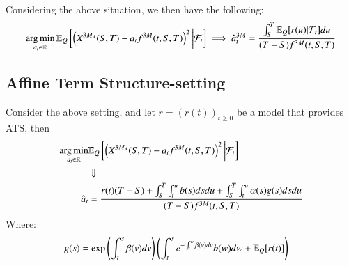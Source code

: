 \begin{result}
\label{result: optimal_SOFR_hedge_3MA_vs_3GM}
Considering the above situation, we then have the following:
\begin{align*}
\operatorname*{arg\,min}\limits_{a_{t} \in \mathbb{R}}\mathbb{E}_{Q}\left[
\left(
X^{3M_{A}}(S,T)-a_{t}f^{3M}(t,S,T)
\right)^{2}
\bigg{|}\mathcal{F}_{t}
\right] 
\implies
\hat{a}_{t}^{3M} = \frac{
\int_{S}^{T}\mathbb{E}_{Q}[r(u)|\mathcal{F}_{t}]du
}{
(T-S)f^{3M}(t,S,T)
}
\end{align*}
\end{result} 

\newpage 

\subsection{Affine Term Structure-setting}

\begin{proposition}
Consider the above setting, and let $r = (r(t))_{t\geq 0}$ be a model that provides ATS, then 
\begin{align*}
\operatorname*{arg\,min}\limits_{a_{t} \in \mathbb{R}}&\mathbb{E}_{Q}\left[
\left(
X^{3M_{A}}(S,T)- a_{t}f^{3M}(t,S,T)
\right)^{2}
\bigg{|}\mathcal{F}_{t}
\right] \\
&\Downarrow \\
\hat{a}_{t} &= \frac{
r(t)(T-S)
+ \int_{S}^{T}\int_{t}^{u}b(s)dsdu 
+ \int_{S}^{T}\int_{t}^{u}\alpha(s)g(s)dsdu
}{
(T-S)f^{3M}(t,S,T)
}
\end{align*}
Where:
\begin{align*}
g(s) &= \exp\left(
\int_{t}^{s}\beta(v)dv
\right)
\left(
\int_{t}^{s}e^{-\int_{t}^{w}\beta(v)dv}b(w)dw + \mathbb{E}_{Q}[r(t)]
\right) 
\end{align*}
\end{proposition}


